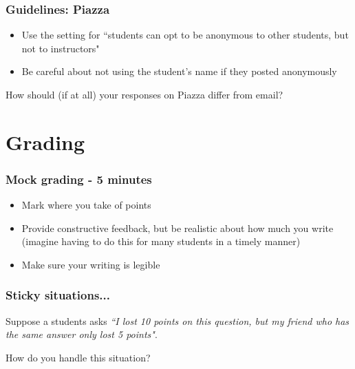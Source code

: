 \documentclass{beamer}
\begin{document}

\begin{frame}
\frametitle{Guidelines: Piazza}

\begin{itemize}[<+->]

\item Use the setting for ``students can opt to be anonymous to other students, but not to instructors"

\item Be careful about not using the student's name if they posted anonymously

\end{itemize}

\vfill

How should (if at all) your responses on Piazza differ from email?

\vfill

\end{frame}


\section{Grading}


\begin{frame}
\frametitle{Mock grading - 5 minutes}

\begin{itemize}

\item Mark where you take of points

\item Provide constructive feedback, but be realistic about how much you write (imagine having to do this for many students in a timely manner)

\item Make sure your writing is legible

\end{itemize}

\end{frame}


\begin{frame}
\frametitle{Sticky situations...}

Suppose a students asks \textit{``I lost 10 points on this question, but my friend who has the same answer only lost 5 points"}.

How do you handle this situation?

\end{frame}
\end{document}
